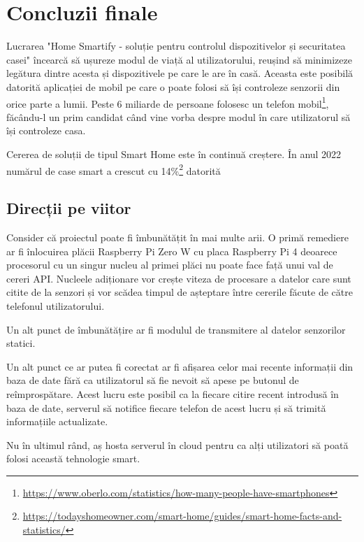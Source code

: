 \chapter*{Concluzii finale} 

Lucrarea "Home Smartify - soluție pentru controlul dispozitivelor și securitatea casei" încearcă să ușureze modul de viață al utilizatorului, reușind să minimizeze legătura dintre acesta și dispozitivele pe care le are în casă. Aceasta este posibilă datorită aplicației de mobil pe care o poate folosi să își controleze senzorii din orice parte a lumii. Peste 6 miliarde de persoane folosesc un telefon mobil\footnote{\url{https://www.oberlo.com/statistics/how-many-people-have-smartphones}}, făcându-l un prim candidat când vine vorba despre modul în care utilizatorul să își controleze casa.

Cererea de soluții de tipul Smart Home este în continuă creștere. În anul 2022 numărul de case smart a crescut cu 14\%\footnote{\url{https://todayshomeowner.com/smart-home/guides/smart-home-facts-and-statistics/}} datorită 

\section{Direcții pe viitor}

Consider că proiectul poate fi îmbunătățit în mai multe arii. O primă remediere ar fi înlocuirea plăcii Raspberry Pi Zero W cu placa Raspberry Pi 4 deoarece procesorul cu un singur nucleu al primei plăci nu poate face față unui val de cereri API. Nucleele adiționare vor crește viteza de procesare a datelor care sunt citite de la senzori și vor scădea timpul de așteptare între cererile făcute de către telefonul utilizatorului.

Un alt punct de îmbunătățire ar fi modulul de transmitere al datelor senzorilor statici.

Un alt punct ce ar putea fi corectat ar fi afișarea celor mai recente informații din baza de date fără ca utilizatorul să fie nevoit să apese pe butonul de reîmprospătare. Acest lucru este posibil ca la fiecare citire recent introdusă în baza de date, serverul să notifice fiecare telefon de acest lucru și să trimită informațiile actualizate.

Nu în ultimul rând, aș hosta serverul în cloud pentru ca alți utilizatori să poată folosi această tehnologie smart.